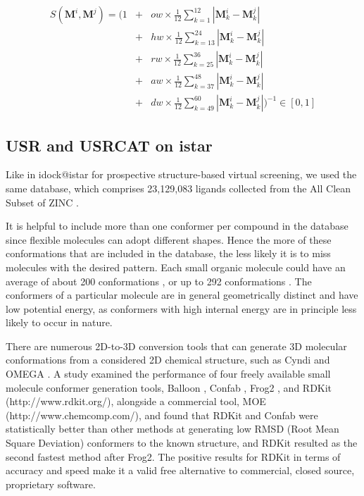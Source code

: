 \begin{eqnarray}
S(\mathbf M^i, \mathbf M^j)=(1
&+&ow\times\frac{1}{12}\sum_{k= 1}^{12}|\mathbf M_k^i-\mathbf M_k^j|\nonumber\\
&+&hw\times\frac{1}{12}\sum_{k=13}^{24}|\mathbf M_k^i-\mathbf M_k^j|\nonumber\\
&+&rw\times\frac{1}{12}\sum_{k=25}^{36}|\mathbf M_k^i-\mathbf M_k^j|\nonumber\\
&+&aw\times\frac{1}{12}\sum_{k=37}^{48}|\mathbf M_k^i-\mathbf M_k^j|\nonumber\\
&+&dw\times\frac{1}{12}\sum_{k=49}^{60}|\mathbf M_k^i-\mathbf M_k^j|)^{-1}\in[0, 1]
\label{usr:usrcatscore}
\end{eqnarray}

\subsection{USR and USRCAT on istar}

Like in idock@istar for prospective structure-based virtual screening, we used the same database, which comprises 23,129,083 ligands collected from the All Clean Subset of ZINC \citep{532,1178}.

It is helpful to include more than one conformer per compound in the database since flexible molecules can adopt different shapes. Hence the more of these conformations that are included in the database, the less likely it is to miss molecules with the desired pattern. Each small organic molecule could have an average of about 200 conformations \citep{1332}, or up to 292 conformations \citep{1280}. The conformers of a particular molecule are in general geometrically distinct and have low potential energy, as conformers with high internal energy are in principle less likely to occur in nature.

There are numerous 2D-to-3D conversion tools that can generate 3D molecular conformations from a considered 2D chemical structure, such as Cyndi \citep{1393,1394} and OMEGA \citep{462}. A study \citep{1127} examined the performance of four freely available small molecule conformer generation tools, Balloon \citep{1442}, Confab \citep{1443}, Frog2 \citep{1444}, and RDKit (http://www.rdkit.org/), alongside a commercial tool, MOE (http://www.chemcomp.com/), and found that RDKit and Confab were statistically better than other methods at generating low RMSD (Root Mean Square Deviation) conformers to the known structure, and RDKit resulted as the second fastest method after Frog2. The positive results for RDKit in terms of accuracy and speed make it a valid free alternative to commercial, closed source, proprietary software.

